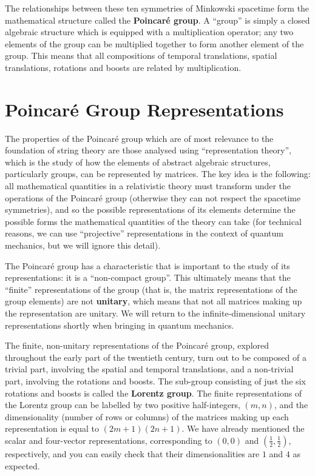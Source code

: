 \documentclass[12pt]{article}
\begin{document}
The relationships between these ten symmetries of Minkowski spacetime form the mathematical structure called the \textbf{Poincaré group}. A ``group'' is simply a closed algebraic structure which is equipped with a multiplication operator; any two elements of the group can be multiplied together to form another element of the group. This means that all compositions of temporal translations, spatial translations, rotations and boosts are related by multiplication.

\section{Poincaré Group Representations}

The properties of the Poincaré group which are of most relevance to the foundation of string theory are those analysed using ``representation theory'', which is the study of how the elements of abstract algebraic structures, particularly groups, can be represented by matrices. The key idea is the following: all mathematical quantities in a relativistic theory must transform under the operations of the Poincaré group (otherwise they can not respect the spacetime symmetries), and so the possible representations of its elements determine the possible forms the mathematical quantities of the theory can take (for technical reasons, we can use ``projective'' representations in the context of quantum mechanics, but we will ignore this detail).
\newline

The Poincaré group has a characteristic that is important to the study of its representations: it is a ``non-compact group''. This ultimately means that the ``finite'' representations of the group (that is, the matrix representations of the group elements) are not \textbf{unitary}, which means that not all matrices making up the representation are unitary. We will return to the infinite-dimensional unitary representations shortly when bringing in quantum mechanics.
\newline

The finite, non-unitary representations of the Poincaré group, explored throughout the early part of the twentieth century, turn out to be composed of a trivial part, involving the spatial and temporal translations, and a non-trivial part, involving the rotations and boosts. The sub-group consisting of just the six rotations and boosts is called the \textbf{Lorentz group}. The finite representations of the Lorentz group can be labelled by two positive half-integers, $\left(m,n\right)$, and the dimensionality (number of rows or columns) of the matrices making up each representation is equal to $\left(2m+1\right)\left(2n+1\right)$. We have already mentioned the scalar and four-vector representations, corresponding to $\left(0,0\right)$ and $\left(\tfrac{1}{2},\tfrac{1}{2}\right)$, respectively, and you can easily check that their dimensionalities are $1$ and $4$ as expected.
\newline
\end{document}
